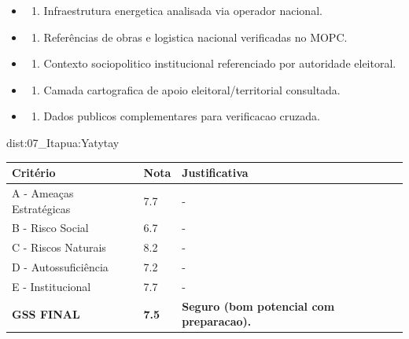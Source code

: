 {\begin{itemize}
\item
  \begin{enumerate}
  \def\labelenumi{\arabic{enumi})}
  \setcounter{enumi}{7}
  \tightlist
  \item
    Infraestrutura energetica analisada via operador nacional.
  \end{enumerate}
\item
  \begin{enumerate}
  \def\labelenumi{\arabic{enumi})}
  \setcounter{enumi}{8}
  \tightlist
  \item
    Referências de obras e logistica nacional verificadas no MOPC.
  \end{enumerate}
\item
  \begin{enumerate}
  \def\labelenumi{\arabic{enumi})}
  \setcounter{enumi}{9}
  \tightlist
  \item
    Contexto sociopolitico institucional referenciado por autoridade
    eleitoral.
  \end{enumerate}
\item
  \begin{enumerate}
  \def\labelenumi{\arabic{enumi})}
  \setcounter{enumi}{10}
  \tightlist
  \item
    Camada cartografica de apoio eleitoral/\allowbreak territorial consultada.
  \end{enumerate}
\item
  \begin{enumerate}
  \def\labelenumi{\arabic{enumi})}
  \setcounter{enumi}{11}
  \tightlist
  \item
    Dados publicos complementares para verificacao cruzada.
  \end{enumerate}
\end{itemize}}{dist:07_Itapua:Yatytay}
\begin{table}[ht!]
\small \begin{tabular}{p{3.0cm}p{0.8cm}p{6.0cm}} \toprule
\textbf{Critério} & \textbf{Nota} & \textbf{Justificativa} \\ \midrule
A - Ameaças Estratégicas & 7.7 & - \\
B - Risco Social & 6.7 & - \\
C - Riscos Naturais & 8.2 & - \\
D - Autossuficiência & 7.2 & - \\
E - Institucional & 7.7 & - \\
\midrule \textbf{GSS FINAL} & \textbf{7.5} & \textbf{Seguro (bom potencial com preparacao).} \\ \bottomrule \end{tabular}
\end{table}
